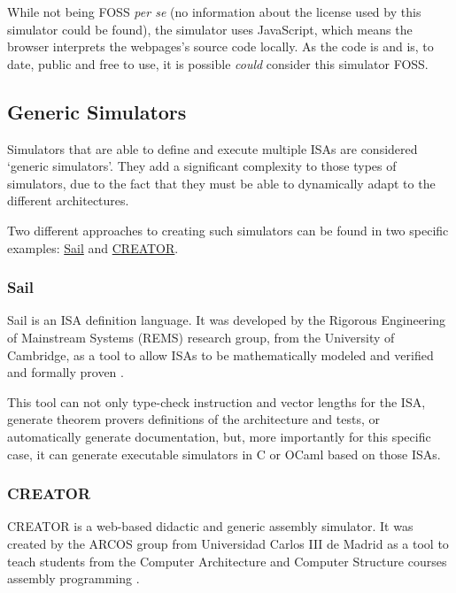 While not being \gls{FOSS} \textit{per se} (no information about the license used by this simulator could be found), the simulator uses JavaScript, which means the browser interprets the webpages's source code locally. As the code is  and is, to date, public and free to use, it is possible \textit{could} consider this simulator \gls{FOSS}.



\subsection{Generic Simulators}\label{subsec:generic-assembly-simulators}
Simulators that are able to define and execute multiple \glspl{ISA} are considered `generic simulators'. They add a significant complexity to those types of simulators, due to the fact that they must be able to dynamically adapt to the different architectures.

Two different approaches to creating such simulators can be found in two specific examples: \hyperref[subsubsec:sail]{Sail} and \hyperref[subsubsec:creator]{CREATOR}.


\subsubsection*{Sail}\label{subsubsec:sail}
Sail \parencite{sail} is an \gls{ISA} definition language. It was developed by the Rigorous Engineering of Mainstream Systems (REMS) \parencite{rems} research group, from the University of Cambridge, as a tool to allow \glspl{ISA} to be mathematically modeled and verified and formally proven \parencite{ArmstrongAlasdair2019IsfA}.

This tool can not only type-check instruction and vector lengths for the \gls{ISA}, generate \glspl{theorem prover} definitions of the architecture and tests, or automatically generate documentation, but, more importantly for this specific case, it can generate executable simulators in C or OCaml based on those \glspl{ISA}.


\subsubsection*{CREATOR}\label{subsubsec:creator}
CREATOR \parencite{creator} is a web-based didactic and generic \gls{assembly} simulator. It was created by the ARCOS group from Universidad Carlos III de Madrid as a tool to teach students from the Computer Architecture and Computer Structure courses \gls{assembly} programming \parencite{creatorZenodo}.

